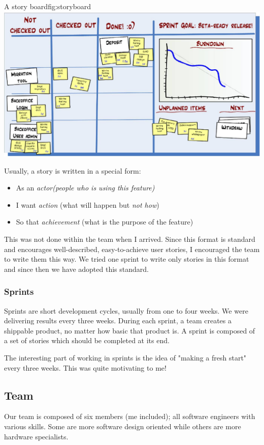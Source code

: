 \begin{figureGraphics}{A story board}{fig:storyboard}
    \includegraphics[width=\textwidth]{./src/img/taskboard.jpg}
\end{figureGraphics}

Usually, a story is written in a special form:
\begin{itemize}
    \item As an \emph{actor(people who is using this feature)}
    \item I want \emph{action} (what will happen but \emph{not how})
    \item So that \emph{achievement} (what is the purpose of the feature)
\end{itemize}
This was not done within the team when I arrived. Since this format is standard and encourages
well-described, easy-to-achieve user stories, I encouraged the team to write them this way.
We tried one sprint to write only stories in this format and since then we have adopted this standard.

\subsubsection{Sprints}\label{sec:sprint}
Sprints are short development cycles, usually from one to four weeks. We were
delivering results every three weeks. During each sprint, a team creates a
shippable product, no matter how basic that product is. A sprint is composed of
a set of stories which should be completed at its end.

The interesting part of working in sprints is the idea of "making a fresh start" every three weeks. This
was quite motivating to me!


\subsection{Team}
Our team is composed of six members (me included); all software engineers with various
skills. Some are more software design oriented while others are more hardware
specialists.


